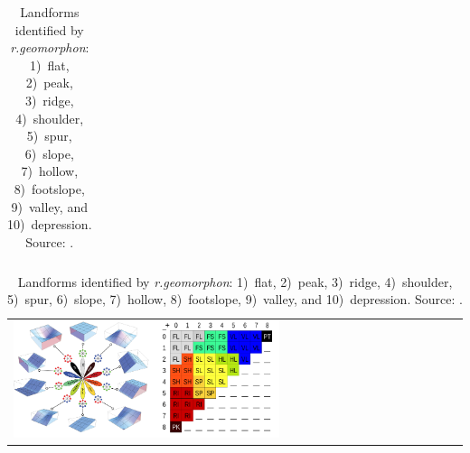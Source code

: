 \documentclass[Afour,sageh,times]{sagej}
\newcommand{\ra}[1]{\renewcommand{\arraystretch}{#1}}
\begin{document}
\begin{table}[h]
\begin{tabular}{m{} m{} m{} m{} m{}}
%
\bottomrule
\end{tabular}
\label{table:topography}
%
\vspace*{1.5em}
%
\caption{Landforms identified by \textit{r.geomorphon}:
		1)~flat, 
		2)~peak, 
		3)~ridge, 
		4)~shoulder, 
		5)~spur, 
		6)~slope, 
		7)~hollow, 
		8)~footslope, 
		9)~valley, and
		10)~depression.
		Source: \cite{r.geomorphon}.}
\vspace*{1em}
\ra{1.3}
\begin{tabular}{m{}}
\includegraphics[width=0.6\textwidth]{images/geomorphons_legend.png}\\
\end{tabular}
\label{fig:geomorphons}
%
\end{table}

\end{document}
